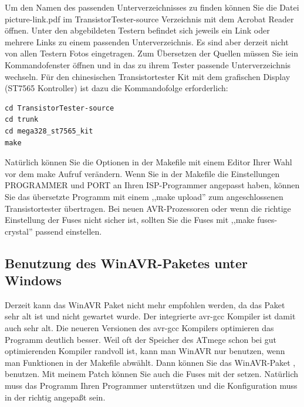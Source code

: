 Um den Namen des passenden Unterverzeichnisses zu finden können Sie die Datei picture-link.pdf im
TransistorTester-source Verzeichnis mit dem Acrobat Reader öffnen. Unter den abgebildeten Testern
befindet sich jeweils ein Link oder mehrere Links zu einem passenden Unterverzeichnis.
Es sind aber derzeit nicht von allen Testern Fotos eingetragen.
Zum Übersetzen der Quellen müssen Sie iein Kommandofenster öffnen und in das zu ihrem Tester passende Unterverzeichnis
wechseln. Für den chinesischen Transistortester Kit mit dem grafischen Display (ST7565 Kontroller) ist dazu die
Kommandofolge erforderlich:
\begin{verbatim}
cd TransistorTester-source
cd trunk
cd mega328_st7565_kit
make
\end{verbatim}
Natürlich können Sie die Optionen in der Makefile mit einem Editor Ihrer Wahl vor dem make Aufruf verändern.
Wenn Sie in der Makefile die Einstellungen PROGRAMMER und PORT an Ihren ISP-Programmer angepasst haben,
können Sie das übersetzte Programm mit einem ,,make upload'' zum angeschlossenen Transistortester übertragen.
Bei neuen AVR-Prozessoren oder wenn die richtige Einstellung der Fuses nicht sicher ist,
sollten Sie die Fuses mit ,,make fuses-crystal'' passend einstellen.


\subsection{Benutzung des WinAVR-Paketes unter Windows}

Derzeit kann das WinAVR Paket nicht mehr empfohlen werden, da das Paket sehr alt ist und nicht gewartet wurde.
Der integrierte avr-gcc Kompiler ist damit auch sehr alt. Die neueren Versionen des avr-gcc Kompilers
optimieren das Programm deutlich besser. Weil oft der Speicher des ATmege schon bei gut optimierenden
Kompiler randvoll ist, kann man WinAVR nur benutzen, wenn man Funktionen in der Makefile abwählt.
Dann können Sie das WinAVR-Paket \cite{winavr1},\cite{winavr2} benutzen.
Mit meinem Patch \cite{winavr3} können Sie auch die Fuses mit der  setzen.
Natürlich muss das  Programm Ihren Programmer unterstützen und die Konfiguration muss in
der  richtig angepaßt sein.

